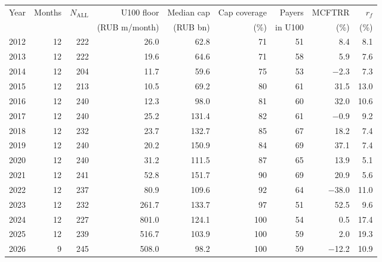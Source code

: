 \begin{tabular}{lrrrrrrrr}
\toprule
Year & Months & $N_{\text{ALL}}$ & U100 floor & Median cap & Cap coverage & Payers & MCFTRR & $r_f$ \\
 & & & (RUB m/month) & (RUB bn) & (\%) & in U100 & (\%) & (\%) \\
\midrule
2012 & 12 & 222 & 26.0 & 62.8 & 71 & 51 & 8.4 & 8.1 \\
2013 & 12 & 222 & 19.6 & 64.6 & 71 & 58 & 5.9 & 7.6 \\
2014 & 12 & 204 & 11.7 & 59.6 & 75 & 53 & $-$2.3 & 7.3 \\
2015 & 12 & 213 & 10.5 & 69.2 & 80 & 61 & 31.5 & 13.0 \\
2016 & 12 & 240 & 12.3 & 98.0 & 81 & 60 & 32.0 & 10.6 \\
2017 & 12 & 240 & 25.2 & 131.4 & 82 & 61 & $-$0.9 & 9.2 \\
2018 & 12 & 232 & 23.7 & 132.7 & 85 & 67 & 18.2 & 7.4 \\
2019 & 12 & 240 & 20.2 & 150.9 & 84 & 69 & 37.1 & 7.4 \\
2020 & 12 & 240 & 31.2 & 111.5 & 87 & 65 & 13.9 & 5.1 \\
2021 & 12 & 241 & 52.8 & 151.7 & 90 & 69 & 20.9 & 5.6 \\
2022 & 12 & 237 & 80.9 & 109.6 & 92 & 64 & $-$38.0 & 11.0 \\
2023 & 12 & 232 & 261.7 & 133.7 & 97 & 51 & 52.5 & 9.6 \\
2024 & 12 & 227 & 801.0 & 124.1 & 100 & 54 & 0.5 & 17.4 \\
2025 & 12 & 239 & 516.7 & 103.9 & 100 & 59 & 2.0 & 19.3 \\
2026 & 9 & 245 & 508.0 & 98.2 & 100 & 59 & $-$12.2 & 10.9 \\
\bottomrule
\end{tabular}